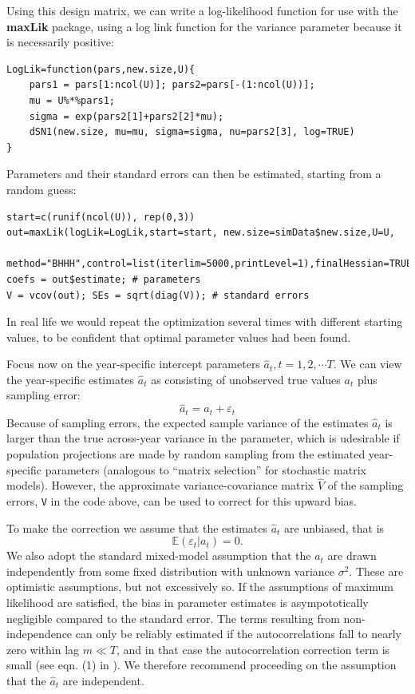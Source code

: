 \documentclass[12pt]{article}
\newcommand{\be}{\begin{equation}}
\newcommand{\ee}{\end{equation}}
\begin{document}
Using this design matrix, we can write a log-likelihood function for use with 
the \textbf{maxLik} package, using a log link function for the variance parameter 
because it is necessarily positive: 
\begin{lstlisting}
LogLik=function(pars,new.size,U){
    pars1 = pars[1:ncol(U)]; pars2=pars[-(1:ncol(U))];
    mu = U%*%pars1;  
    sigma = exp(pars2[1]+pars2[2]*mu);
    dSN1(new.size, mu=mu, sigma=sigma, nu=pars2[3], log=TRUE)
}
\end{lstlisting} 
Parameters and their standard errors can then be estimated, starting from a random guess: 
\begin{lstlisting}
start=c(runif(ncol(U)), rep(0,3))
out=maxLik(logLik=LogLik,start=start, new.size=simData$new.size,U=U,
  method="BHHH",control=list(iterlim=5000,printLevel=1),finalHessian=TRUE);
coefs = out$estimate; # parameters
V = vcov(out); SEs = sqrt(diag(V));	# standard errors 
\end{lstlisting}  
In real life we would repeat the optimization several times with different starting values, 
to be confident that optimal parameter values had been found. 

Focus now on the year-specific intercept parameters $\hat{a}_t, t = 1,2,\cdots T$. 
We can view the year-specific estimates $\hat{a}_t$ as consisting of unobserved true values $a_t$ plus sampling error:
\be
\hat{a}_t= a_t + \varepsilon_t 
\ee
Because of sampling errors, the expected sample variance of the estimates $\hat{a}_t$ is larger 
than the true across-year variance in the parameter, which is udesirable if population projections are made
by random sampling from the estimated year-specific parameters (analogous to ``matrix selection'' for stochastic
matrix models). However, the approximate variance-covariance matrix $\hat{V}$ of the sampling errors, \texttt{V} in the code 
above, can be used to correct for this upward bias.   

To make the correction we assume that the estimates $\hat{a}_t$ are unbiased, that is
\be
\mathbb{E}(\varepsilon_t \vert a_t) = 0.    
\ee
We also adopt the standard mixed-model assumption that the $a_t$ are drawn 
independently from some fixed distribution with unknown variance $\sigma^2$. 
These are optimistic assumptions, but not excessively so. If the assumptions of maximum likelihood are satisfied, 
the bias in parameter estimates is asympototically negligible compared to the standard error. 
The terms resulting from non-independence can only be reliably estimated if 
the autocorrelations fall to nearly zero within lag $m \ll T$, 
and in that case the autocorrelation correction term is small (see eqn. (1) in \citet{gould-nichols-1998}). 
We therefore recommend proceeding on the assumption that the $\hat{a}_t$ are independent. 
\end{document}
